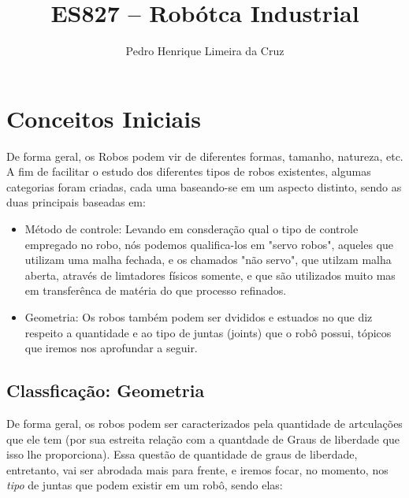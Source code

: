 \documentclass{article}
\author{Pedro Henrique Limeira da Cruz}
\title{ES827 – Robótca Industrial}
\begin{document}
    
    \maketitle
    \thispagestyle{empty}
    
    
    \newpage
    \tableofcontents
    \newpage
    \section{Conceitos Iniciais}
        De forma geral, os Robos podem vir de diferentes formas, tamanho, natureza, etc. A fim de facilitar o estudo dos diferentes tipos de robos existentes, algumas categorias foram criadas, cada uma baseando-se em um aspecto distinto, sendo as duas principais baseadas em:
        \begin{itemize}
            \item Método de controle: Levando em consderação qual o tipo de controle empregado no robo, nós podemos qualifica-los em "servo robos", aqueles que utilizam uma malha fechada, e os chamados "não servo", que utilzam malha aberta, através de limtadores físicos somente, e que são utilizados muito mas em transferênca de matéria do que processo refinados.
            \item Geometria: Os robos também podem ser dvididos e estuados no que diz respeito a quantidade e ao tipo de juntas (joints) que o robô possui, tópicos que iremos nos aprofundar a seguir.
        \end{itemize}

        \subsection{Classficação: Geometria}
        De forma geral, os robos podem ser caracterizados pela quantidade de artculações que ele tem (por sua estreita relação com a quantdade de Graus de liberdade que isso lhe proporciona). Essa questão de quantidade de graus de liberdade, entretanto, vai ser abrodada mais para frente, e iremos focar, no momento, nos \emph{tipo} de juntas que podem existir em um robô, sendo elas:
\end{document}
